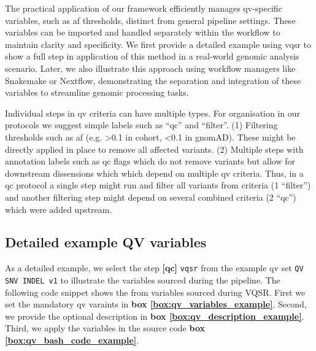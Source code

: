The practical application of our framework efficiently manages \ac{qv}-specific variables, such as \ac{af} thresholds, distinct from general pipeline settings. These variables can be imported and handled separately within the workflow to maintain clarity and specificity.  
We first provide a detailed example using \ac{vqsr} to show a full step in application of this method in a real-world genomic analysis scenario.
Later, we also illustrate this approach using workflow managers like Snakemake or Nextflow, demonstrating the separation and integration of these variables to streamline genomic processing tasks.


Individual steps in \ac{qv} criteria can have multiple types. 
For organisation in our protocols we suggest simple labels such as ``\ac{qc}'' and ``filter''. 
(1) Filtering thresholds such as \ac{af} (e.g. >0.1 in cohort, <0.1 in gnomAD). These might be directly applied in place to remove all affected variants. 
(2) Multiple steps with annotation labels such as \ac{qc} flags which do not remove variants but allow for downstream dissensions which which depend on multiple \ac{qv} criteria. 
Thus, in a \ac{qc} protocol a single step might run and filter all variants from criteria (1 ``filter'') and another filtering step might depend on several combined criteria (2 ``\ac{qc}'') which were added upstream.

\subsection{Detailed example QV variables}\label{sec:protocol_variables_example}
As a detailed example, we select the step \textbf{[\ac{qc}]} \colorbox{kispiblue!30}{\texttt{vqsr}} from the example \ac{qv} set
\colorbox{colorSUNSET2!60}{\texttt{QV SNV INDEL v1}}
to illustrate the variables sourced during the pipeline.
The following code snippet shows the from variables sourced during VQSR. 
First we set the mandatory \ac{qv} varaints in 
\textbf{box \ref{box:qv_variables_example}}.
Second, we provide the optional description in 
\textbf{box \ref{box:qv_description_example}}.
Third, we apply the variables in the source code 
\textbf{box \ref{box:qv_bash_code_example}}. 

